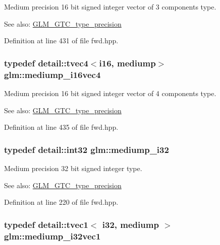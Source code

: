 Medium precision 16 bit signed integer vector of 3 components type. \begin{Desc}
\item[See also:]\hyperlink{group__gtc__type__precision}{GLM\_\-GTC\_\-type\_\-precision} \end{Desc}


Definition at line 431 of file fwd.hpp.\hypertarget{group__gtc__type__precision_gd9aca299fc3e96c84be6b063381c9f3e}{
\subsubsection[mediump\_\-i16vec4]{\setlength{\rightskip}{0pt plus 5cm}typedef detail::tvec4$<$i16, mediump$>$ {\bf glm::mediump\_\-i16vec4}}}
\label{group__gtc__type__precision_gd9aca299fc3e96c84be6b063381c9f3e}


Medium precision 16 bit signed integer vector of 4 components type. \begin{Desc}
\item[See also:]\hyperlink{group__gtc__type__precision}{GLM\_\-GTC\_\-type\_\-precision} \end{Desc}


Definition at line 435 of file fwd.hpp.\hypertarget{group__gtc__type__precision_g5e00ec824eb55968a6b6496f294d8c07}{
\subsubsection[mediump\_\-i32]{\setlength{\rightskip}{0pt plus 5cm}typedef detail::int32 {\bf glm::mediump\_\-i32}}}
\label{group__gtc__type__precision_g5e00ec824eb55968a6b6496f294d8c07}


Medium precision 32 bit signed integer type. \begin{Desc}
\item[See also:]\hyperlink{group__gtc__type__precision}{GLM\_\-GTC\_\-type\_\-precision} \end{Desc}


Definition at line 220 of file fwd.hpp.\hypertarget{group__gtc__type__precision_g44c6a3b78e635d91e35e1c41ab6b0ba1}{
\subsubsection[mediump\_\-i32vec1]{\setlength{\rightskip}{0pt plus 5cm}typedef detail::tvec1$<$ i32, mediump $>$ {\bf glm::mediump\_\-i32vec1}}}
\label{group__gtc__type__precision_g44c6a3b78e635d91e35e1c41ab6b0ba1}


